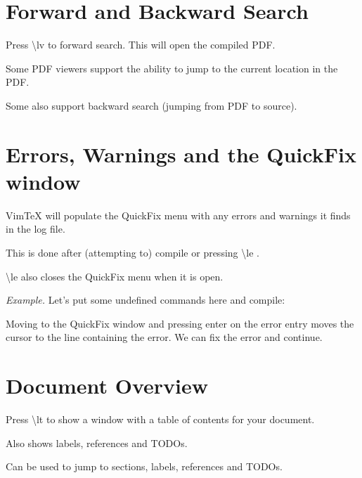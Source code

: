 \documentclass{article}
\newcommand{\lt}{\textbackslash{}lt }
\newcommand{\lv}{\textbackslash{}lv }
\renewcommand{\le}{\textbackslash{}le }
\begin{document}
\section{Forward and Backward Search}

Press \lv to forward search. This will open the compiled PDF.

Some PDF viewers support the ability to jump to the current location in the PDF.

Some also support backward search (jumping from PDF to source).
















\section{Errors, Warnings and the QuickFix window}

VimTeX will populate the QuickFix menu with any errors and warnings it finds in
the log file.

This is done after (attempting to) compile or pressing \le.

\le also closes the QuickFix menu when it is open.

\emph{Example.} Let's put some undefined commands here and compile:

Moving to the QuickFix window and pressing enter on the error entry moves the
cursor to the line containing the error. We can fix the error and continue.










\section{Document Overview}

Press \lt to show a window with a table of contents for your document.

Also shows labels, references and TODOs. 

Can be used to jump to sections, labels, references and TODOs.

\end{document}
